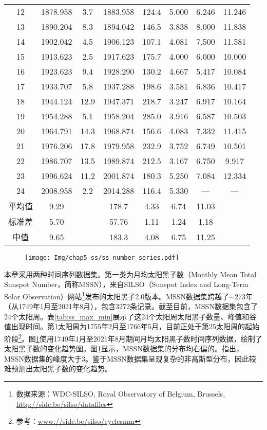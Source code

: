 \begin{table}[!htbp]
\begin{tabular}{cccccccc}
    12 & 1878.958 & 3.7 & 1883.958 & 124.4 & 5.000 & 6.246 & 11.246 \\
    13 & 1890.204 & 8.3 & 1894.042 & 146.5 & 3.838 & 8.000 & 11.838 \\
    14 & 1902.042 & 4.5 & 1906.123 & 107.1 & 4.081 & 7.500 & 11.581 \\
    15 & 1913.623 & 2.5 & 1917.623 & 175.7 & 4.000 & 6.000 & 10.000 \\
    16 & 1923.623 & 9.4 & 1928.290 & 130.2 & 4.667 & 5.417 & 10.084 \\
    17 & 1933.707 & 5.8 & 1937.288 & 198.6 & 3.581 & 6.836 & 10.417 \\
    18 & 1944.124 & 12.9 & 1947.371 & 218.7 & 3.247 & 6.917 & 10.164 \\
    19 & 1954.288 & 5.1 & 1958.204 & 285.0 & 3.916 & 6.587 & 10.503 \\
    20 & 1964.791 & 14.3 & 1968.874 & 156.6 & 4.083 & 7.332 & 11.415 \\
    21 & 1976.206 & 17.8 & 1979.958 & 232.9 & 3.752 & 6.749 & 10.501 \\
    22 & 1986.707 & 13.5 & 1989.874 & 212.5 & 3.167 & 6.750 & 9.917 \\
    23 & 1996.624 & 11.2 & 2001.874 & 180.3 & 5.250 & 7.084 & 12.334  \\
    24 & 2008.958 & 2.2 & 2014.288 & 116.4 & 5.330 & — & —  \\
    平均值 & 9.29 &  & 178.7 & 4.33 & 6.74 & 11.03  \\
    标准差 & 5.70 &  & 57.76 & 1.11 & 1.24 & 1.18 \\
    中值 & 9.65 &  & 183.3 & 4.08 & 6.75 & 11.25 \\
    \bottomrule
  \end{tabular}
\end{table}

\begin{figure}[!htbp]
  \centering
  \texttt{[image: Img/chap5\_ss/ss\_number\_series.pdf]}
  \vspace{-1.4cm}
  \label{fig:ss_number_series}
\end{figure}

本章采用两种时间序列数据集。第一类为月均太阳黑子数（Monthly Mean Total Sunspot Number，简称MSSN），来自SILSO（Sunspot Index and Long-Term Solar Observation）网站\footnote{数据来源：WDC-SILSO, Royal Observatory of Belgium, Brussels, \href{http://sidc.be/silso/datafiles}{http://sidc.be/silso/datafiles}}发布的太阳黑子2.0版本。MSSN数据集跨越了$\sim$273年（从1749年1月至2021年8月），包含3272条记录。截至目前，MSSN数据集包含了24个太阳周。表\ref{tab:ss_max_min}展示了这24个太阳周太阳黑子数量、峰值和谷值出现时间。第1太阳周为1755年2月至1766年5月，目前正处于第25太阳周的起始阶段\footnote{参考：\href{www://sidc.be/silso/cyclesmm}{www://sidc.be/silso/cyclesmm}}。图\ref{fig:ss_number_series}使用1749年1月至2021年8月期间月均太阳黑子数时间序列数据，绘制了太阳黑子数的变化趋势图。图\ref{fig:ss_number_series}显示，MSSN数据集的分布均右偏的。\citet{panigrahi2021forecasting}指出，MSSN数据集的峰度大于3。鉴于MSSN数据集呈现复杂的非高斯型分布，因此较难预测出太阳黑子数的变化趋势。

